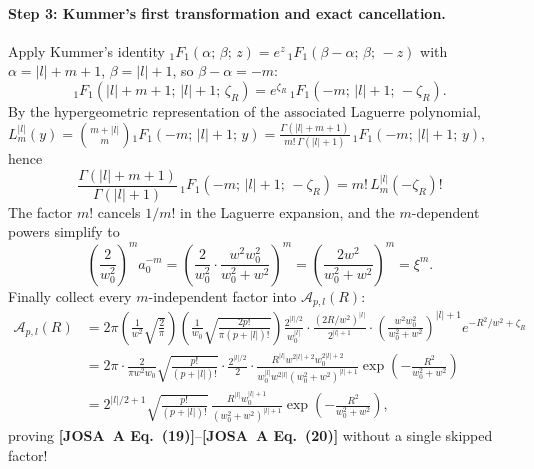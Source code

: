 \documentclass[10pt,letterpaper]{article}
\newcommand{\abs}[1]{\lvert #1 \rvert}
\newcommand{\josa}[1]{\textbf{[JOSA~A Eq.~(#1)]}}
\numberwithin{equation}{section}
\begin{document}
\paragraph*{Step 3: Kummer's first transformation and exact cancellation.}
Apply Kummer's identity ${}_1F_1(\alpha;\,\beta;\,z) = e^z\,{}_1F_1(\beta-\alpha;\,\beta;\,-z)$ with $\alpha = \abs{l}+m+1$, $\beta = \abs{l}+1$, so $\beta - \alpha = -m$:
\begin{equation}
  {}_1F_1(\abs{l}+m+1;\,\abs{l}+1;\,\zeta_R) = e^{\zeta_R}\,{}_1F_1(-m;\,\abs{l}+1;\,-\zeta_R).
\end{equation}
By the hypergeometric representation of the associated Laguerre polynomial, $L_m^{\abs{l}}(y) = \binom{m+\abs{l}}{m}{}_1F_1(-m;\,\abs{l}+1;\,y) = \frac{\Gamma(\abs{l}+m+1)}{m!\,\Gamma(\abs{l}+1)}\,{}_1F_1(-m;\,\abs{l}+1;\,y)$, hence
\begin{equation}
  \frac{\Gamma(\abs{l}+m+1)}{\Gamma(\abs{l}+1)}\,{}_1F_1(-m;\,\abs{l}+1;\,-\zeta_R) = m!\,L_m^{\abs{l}}(-\zeta_R)!
\end{equation}
The factor $m!$ cancels $1/m!$ in the Laguerre expansion, and the $m$-dependent powers simplify to
\begin{equation}
  \left(\frac{2}{w_0^2}\right)^m a_0^{-m} = \left(\frac{2}{w_0^2}\cdot\frac{w^2 w_0^2}{w_0^2+w^2}\right)^m = \left(\frac{2w^2}{w_0^2+w^2}\right)^m = \xi^m.
\end{equation}
Finally collect every $m$-independent factor into $\mathcal{A}_{p,l}(R)$:
\begin{align}
  \mathcal{A}_{p,l}(R) &= 2\pi\left(\frac{1}{w^2}\sqrt{\frac{2}{\pi}}\right)\left(\frac{1}{w_0}\sqrt{\frac{2p!}{\pi(p+\abs{l})!}}\right)\frac{2^{\abs{l}/2}}{w_0^{\abs{l}}}\cdot\frac{(2R/w^2)^{\abs{l}}}{2^{\abs{l}+1}}\cdot\left(\frac{w^2 w_0^2}{w_0^2+w^2}\right)^{\abs{l}+1} e^{-R^2/w^2 + \zeta_R} \nonumber \\
  &= 2\pi\cdot\frac{2}{\pi w^2 w_0}\sqrt{\frac{p!}{(p+\abs{l})!}}\cdot\frac{2^{\abs{l}/2}}{2}\cdot\frac{R^{\abs{l}} w^{2\abs{l}+2} w_0^{2\abs{l}+2}}{w_0^{\abs{l}} w^{2\abs{l}}(w_0^2+w^2)^{\abs{l}+1}}\exp\!\left(-\frac{R^2}{w_0^2+w^2}\right) \nonumber \\
  &= 2^{\abs{l}/2 + 1}\sqrt{\frac{p!}{(p+\abs{l})!}}\,\frac{R^{\abs{l}} w_0^{\abs{l}+1}}{(w_0^2+w^2)^{\abs{l}+1}}\exp\!\left(-\frac{R^2}{w_0^2+w^2}\right),
\end{align}
proving \josa{19}--\josa{20} without a single skipped factor!
\end{document}
